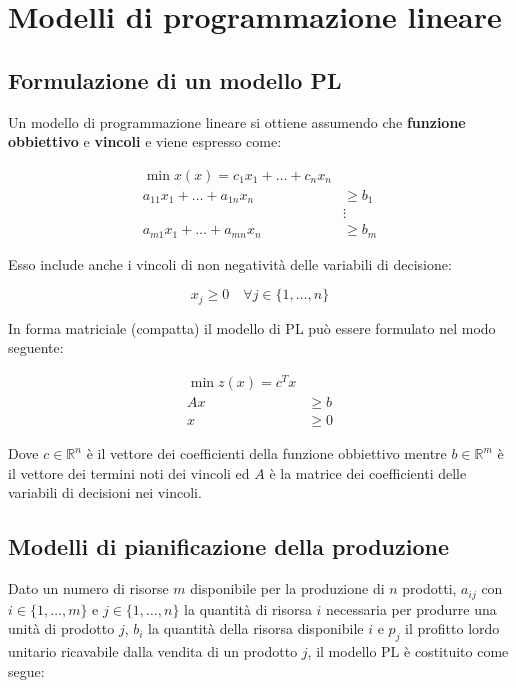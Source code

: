 \documentclass[\main/main.tex]{subfiles}
\begin{document}
\chapter{Modelli di programmazione lineare}

\section{Formulazione di un modello PL}
Un modello di programmazione lineare si ottiene assumendo che \textbf{funzione obbiettivo} e \textbf{vincoli} e viene espresso come:

\begin{align*}
	\min x(x) = c_1x_1 + \ldots + c_nx_n       \\
	a_{11}x_1 +  \ldots + a_{1n}x_n & \geq b_1 \\
	                                & \vdots   \\
	a_{m1}x_1 +  \ldots + a_{mn}x_n & \geq b_m
\end{align*}

Esso include anche i vincoli di non negatività delle variabili di decisione:

\[
	x_j \geq 0 \quad \forall j \in \{1,\ldots,n\}
\]

In forma matriciale (compatta) il modello di PL può essere formulato nel modo seguente:

\begin{align*}
	\min z(x) = c^Tx \\
	Ax & \geq b      \\
	x  & \geq 0
\end{align*}

Dove $c \in \mathbb{R}^n$ è il vettore dei coefficienti della funzione obbiettivo mentre $b \in \mathbb{R}^m$ è il vettore dei termini noti dei vincoli ed $A$ è la matrice dei coefficienti delle variabili di decisioni nei vincoli.

\section{Modelli di pianificazione della produzione}
Dato un numero di risorse $m$ disponibile per la produzione di $n$ prodotti, $a_{ij}$ con $i \in \{1,\ldots,m\}$ e $j \in \{1,\ldots,n\}$ la quantità di risorsa $i$ necessaria per produrre una unità di prodotto $j$, $b_i$ la quantità della risorsa disponibile $i$ e $p_j$ il profitto lordo unitario ricavabile dalla vendita di un prodotto $j$, il modello PL è costituito come segue:
\end{document}
